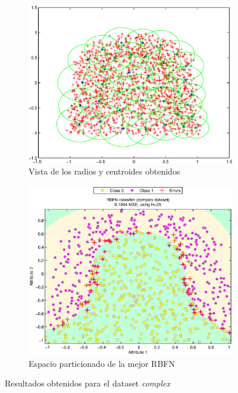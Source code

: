 \documentclass[journal]{IEEEtran}
\begin{document}
\begin{figure}
\centering
    \begin{subfigure}[b]{0.5\textwidth}            
            \includegraphics[width=\textwidth]{imagenes/complex-centroids}
            \caption{Vista de los radios y centroides obtenidos}
            \label{fig:complex-centroids}
    \end{subfigure}%
    \begin{subfigure}[b]{0.5\textwidth}
            \centering
            \includegraphics[width=\textwidth]{imagenes/complex}
            \caption{Espacio particionado de la mejor RBFN}
            \label{fig:complex-partition}
    \end{subfigure}
    \caption{Resultados obtenidos para el dataset \emph{complex}}\label{fig:espacio-particionado-complex}
\end{figure}
\end{document}
